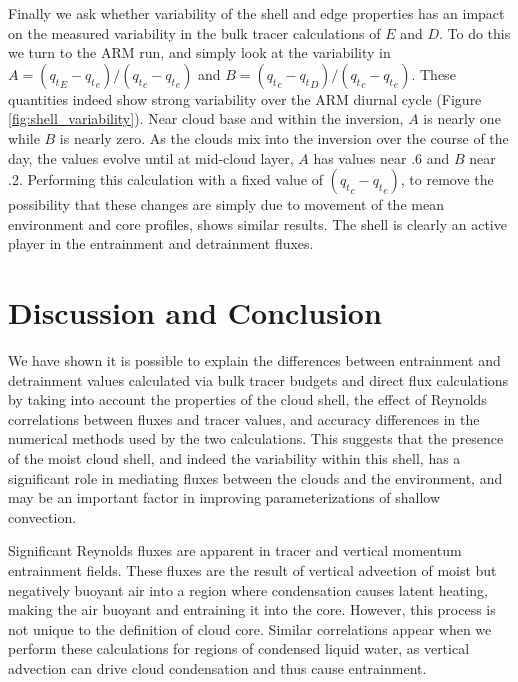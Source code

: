 \documentclass[draft,grl]{agutex}
\begin{document}
\begin{article}
Finally we ask whether variability of the shell and edge properties has an 
impact on the measured variability in the bulk tracer calculations of $E$ and 
$D$.  To do this we turn to the ARM run, and simply look at the variability in 
$A = ({q_t}_E - {q_t}_e)/({q_t}_c - {q_t}_e)$ and 
$B = ({q_t}_c - {q_t}_D)/({q_t}_c - {q_t}_e)$.  These quantities indeed show 
strong variability over the ARM diurnal cycle (Figure 
\ref{fig:shell_variability}).  Near cloud base and within the inversion, $A$ 
is nearly one while $B$ is nearly zero.  As the clouds mix into the inversion 
over the course of the day, the values evolve until at mid-cloud layer, $A$ 
has values near .6 and $B$ near .2.  Performing this calculation with a fixed 
value of $({q_t}_c - {q_t}_e)$, to remove the possibility that these changes 
are simply due to movement of the mean environment and core profiles, shows 
similar results.  The shell is clearly an active player in the entrainment and 
detrainment fluxes.


\section{Discussion and Conclusion}

We have shown it is possible to explain the differences between entrainment and 
detrainment values calculated via bulk tracer budgets and direct flux 
calculations by taking into account the properties of the cloud shell, the 
effect of Reynolds correlations between fluxes and tracer values, and 
accuracy differences in the numerical methods used by the two calculations.
This suggests that the presence of the moist cloud shell, and indeed the 
variability within this shell, has a significant role in mediating fluxes 
between the clouds and the environment, and may be an important factor in 
improving parameterizations of shallow convection.

Significant Reynolds fluxes are apparent in tracer and vertical momentum 
entrainment fields.  These fluxes are the result of vertical advection of 
moist but negatively buoyant air into a region where condensation causes 
latent heating, making the air buoyant and entraining it into the core.
However, this process is not unique to the definition of cloud core.  Similar 
correlations appear when we perform these calculations for regions of
condensed liquid water, as vertical advection can drive cloud condensation and 
thus cause entrainment.


\end{article}
\end{document}
